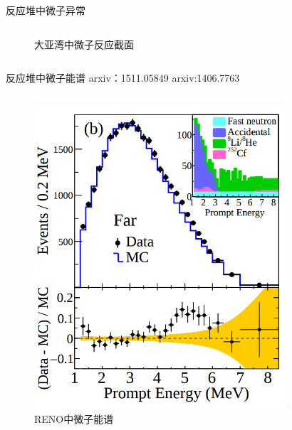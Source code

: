 \documentclass[11pt,compress,xcolor=x11names,UTF8]{beamer}
\begin{document}
\begin{frame}{反应堆中微子异常}
\begin{columns}
\begin{column}{.45\textwidth}
\begin{figure}
\caption{大亚湾中微子反应截面}
\end{figure}
\end{column}
\end{columns}

\end{frame}
\begin{frame}{反应堆中微子能谱}
arxiv：1511.05849 \qquad arxiv:1406.7763
\begin{columns}
\begin{column}{.4\textwidth}
\begin{figure}
\centering
\includegraphics[width=\textwidth]{k_RENO} %
\caption{RENO中微子能谱}
\end{figure}
\end{column}
\begin{column}{.45\textwidth}
\begin{figure}
\centering

\end{figure}
\end{column}
\end{columns}
\end{frame}
\end{document}
